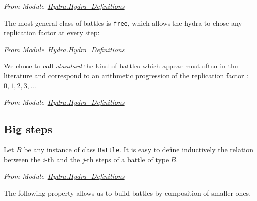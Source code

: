 \vspace{4pt}
\emph{From Module~\href{../theories/html/hydras.Hydra.Hydra_Definitions.html}{Hydra.Hydra\_Definitions}}
\label{types:Battle}




The most general class of battles is \texttt{free}, which allows the hydra to chose any replication factor at every step:

\vspace{4pt}
\emph{From Module~\href{../theories/html/hydras.Hydra.Hydra_Definitions.html\#free}{Hydra.Hydra\_Definitions}}



We chose to call \emph{standard} the kind of battles which appear  most often in the literature and correspond to an arithmetic progression of the replication factor : $0,1,2,3, \dots$

\vspace{4pt}
\emph{From Module~\href{../theories/html/hydras.Hydra.Hydra_Definitions.html\#standard}{Hydra.Hydra\_Definitions}}





\subsection{Big steps}

Let $B$ be any instance of class \texttt{Battle}. It is easy to define inductively the relation between the $i$-th and the $j$-th steps of a battle of type $B$.

\vspace{4pt}
\emph{From Module~\href{../theories/html/hydras.Hydra.Hydra_Definitions.html\#fight}{Hydra.Hydra\_Definitions}}




The following property allows us to build battles by composition of smaller ones.






